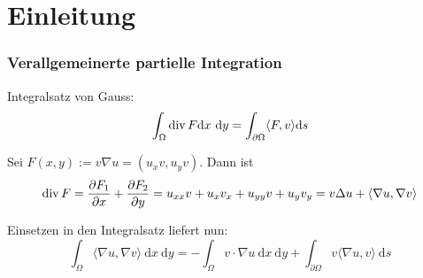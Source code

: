 \chapter{Einleitung}

\subsection*{Verallgemeinerte partielle Integration}
Integralsatz von Gauss:
\[
\int_\Omega \operatorname{div} F \mathrm dx \ \mathrm dy = \int_{\partial \Omega} \langle F, v \rangle \mathrm ds
\]

Sei $F(x,y) := v \nabla u = (u_x v, u_y v)$.
Dann ist 
\[
\operatorname{div} F = \frac{\partial F_1}{\partial x} + \frac{\partial F_2}{\partial y}
    = u_{xx} v + u_x v_x + u_{yy} v + u_y v_y
    = v \Delta u + \langle \nabla u, \nabla v \rangle
\]

Einsetzen in den Integralsatz liefert nun:
\[
\int_\Omega \langle \nabla u, \nabla v \rangle \ \mathrm dx \ \mathrm dy
    = - \int_\Omega v \cdot \nabla u \ \mathrm dx \ \mathrm dy
    + \int_{\partial \Omega} v \langle \nabla u, v \rangle \ \mathrm ds
\]
